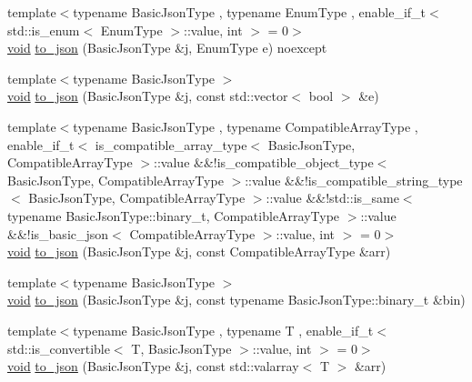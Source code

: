 \begin{DoxyCompactItemize}
\item 
{\footnotesize template$<$typename Basic\+Json\+Type , typename Enum\+Type , enable\+\_\+if\+\_\+t$<$ std\+::is\+\_\+enum$<$ Enum\+Type $>$\+::value, int $>$  = 0$>$ }\\\hyperlink{namespacenlohmann_1_1detail_a59fca69799f6b9e366710cb9043aa77d}{void} \hyperlink{namespacenlohmann_1_1detail_a0c8b159dba71981d6c555d284cf6e2bf}{to\+\_\+json} (Basic\+Json\+Type \&j, Enum\+Type e) noexcept
\item 
{\footnotesize template$<$typename Basic\+Json\+Type $>$ }\\\hyperlink{namespacenlohmann_1_1detail_a59fca69799f6b9e366710cb9043aa77d}{void} \hyperlink{namespacenlohmann_1_1detail_aeca6fb5fede5ed1e12a4420d98a5692b}{to\+\_\+json} (Basic\+Json\+Type \&j, const std\+::vector$<$ bool $>$ \&e)
\item 
{\footnotesize template$<$typename Basic\+Json\+Type , typename Compatible\+Array\+Type , enable\+\_\+if\+\_\+t$<$ is\+\_\+compatible\+\_\+array\+\_\+type$<$ Basic\+Json\+Type, Compatible\+Array\+Type $>$\+::value \&\&!is\+\_\+compatible\+\_\+object\+\_\+type$<$ Basic\+Json\+Type, Compatible\+Array\+Type $>$\+::value \&\&!is\+\_\+compatible\+\_\+string\+\_\+type$<$ Basic\+Json\+Type, Compatible\+Array\+Type $>$\+::value \&\&!std\+::is\+\_\+same$<$ typename Basic\+Json\+Type\+::binary\+\_\+t, Compatible\+Array\+Type $>$\+::value \&\&!is\+\_\+basic\+\_\+json$<$ Compatible\+Array\+Type $>$\+::value, int $>$  = 0$>$ }\\\hyperlink{namespacenlohmann_1_1detail_a59fca69799f6b9e366710cb9043aa77d}{void} \hyperlink{namespacenlohmann_1_1detail_a3afebc132c5ff83f9cd160e52030fdfd}{to\+\_\+json} (Basic\+Json\+Type \&j, const Compatible\+Array\+Type \&arr)
\item 
{\footnotesize template$<$typename Basic\+Json\+Type $>$ }\\\hyperlink{namespacenlohmann_1_1detail_a59fca69799f6b9e366710cb9043aa77d}{void} \hyperlink{namespacenlohmann_1_1detail_a22191081208b226e3875e1118107c281}{to\+\_\+json} (Basic\+Json\+Type \&j, const typename Basic\+Json\+Type\+::binary\+\_\+t \&bin)
\item 
{\footnotesize template$<$typename Basic\+Json\+Type , typename T , enable\+\_\+if\+\_\+t$<$ std\+::is\+\_\+convertible$<$ T, Basic\+Json\+Type $>$\+::value, int $>$  = 0$>$ }\\\hyperlink{namespacenlohmann_1_1detail_a59fca69799f6b9e366710cb9043aa77d}{void} \hyperlink{namespacenlohmann_1_1detail_a7f7c7b9760161b774cdc0b4b838fae64}{to\+\_\+json} (Basic\+Json\+Type \&j, const std\+::valarray$<$ T $>$ \&arr)

\end{DoxyCompactItemize}
